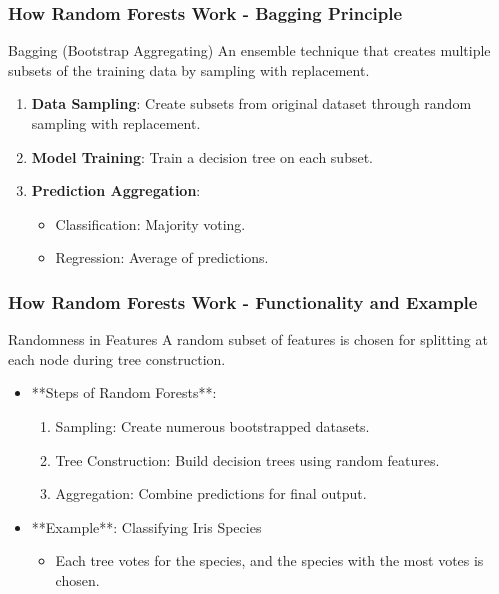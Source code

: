 \documentclass[aspectratio=169]{beamer}
\begin{document}
\begin{frame}[fragile]
    \frametitle{How Random Forests Work - Bagging Principle}
    \begin{block}{Bagging (Bootstrap Aggregating)}
        An ensemble technique that creates multiple subsets of the training data by sampling with replacement.
    \end{block}
    \begin{enumerate}
        \item \textbf{Data Sampling}: Create subsets from original dataset through random sampling with replacement.
        \item \textbf{Model Training}: Train a decision tree on each subset.
        \item \textbf{Prediction Aggregation}: 
        \begin{itemize}
            \item Classification: Majority voting.
            \item Regression: Average of predictions.
        \end{itemize}
    \end{enumerate}
\end{frame}

\begin{frame}[fragile]
    \frametitle{How Random Forests Work - Functionality and Example}
    \begin{block}{Randomness in Features}
        A random subset of features is chosen for splitting at each node during tree construction.
    \end{block}
    \begin{itemize}
        \item **Steps of Random Forests**:
        \begin{enumerate}
            \item Sampling: Create numerous bootstrapped datasets.
            \item Tree Construction: Build decision trees using random features.
            \item Aggregation: Combine predictions for final output.
        \end{enumerate}
        \item **Example**: Classifying Iris Species
        \begin{itemize}
            \item Each tree votes for the species, and the species with the most votes is chosen.
        \end{itemize}
    \end{itemize}
\end{frame}
\end{document}
